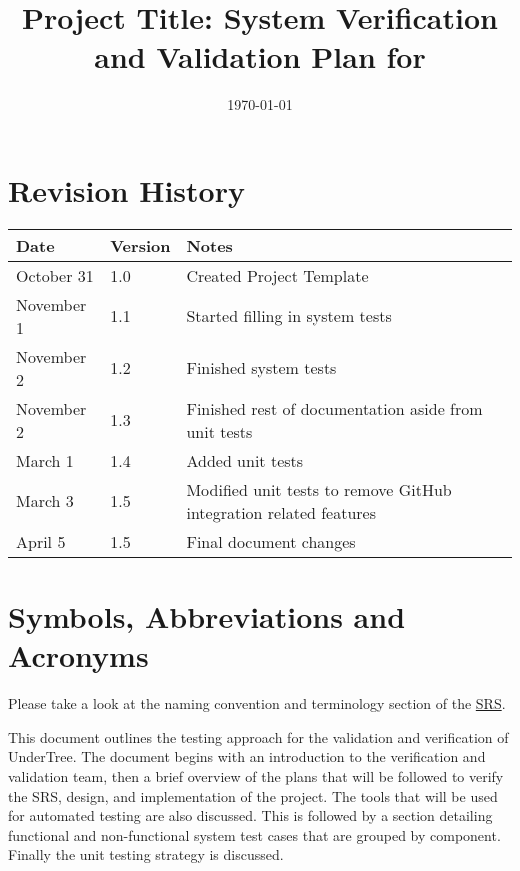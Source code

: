 \documentclass[12pt, titlepage]{article}
\begin{document}
	
	\title{Project Title: System Verification and Validation Plan for \progname{}} 
	\author{\authname}
	\date{\today}
	
	\maketitle
	
	
	\section{Revision History}
	
	\begin{tabularx}{\textwidth}{p{3cm}p{2cm}X}
		\toprule {\bf Date} & {\bf Version} & {\bf Notes}\\
		\midrule
		October 31 & 1.0 & Created Project Template\\
		November 1 & 1.1 & Started filling in system tests\\
		November 2 & 1.2 & Finished system tests\\
		November 2 & 1.3 & Finished rest of documentation aside from unit tests\\
		March 1 & 1.4 & Added unit tests\\
		March 3 & 1.5 & Modified unit tests to remove GitHub integration related features\\
		April 5 & 1.5 & Final document changes \\
		\bottomrule
	\end{tabularx}
	
	\newpage
	
	\tableofcontents
	
	\listoftables
	
	\newpage
	
	\section{Symbols, Abbreviations and Acronyms}
	
	Please take a look at the naming convention and terminology section of the \href{https://github.com/RutheniumVI/UnderTree/blob/main/docs/SRS/SRS.pdf}{SRS}.
	
	\newpage
	
	
	This document outlines the testing approach for the validation and verification of UnderTree. The document begins with an introduction to the verification and validation team, then a brief overview of the plans that will be followed to verify the SRS, design, and implementation of the project. The tools that will be used for automated testing are also discussed. This is followed by a section detailing functional and non-functional system test cases that are grouped by component. Finally the unit testing strategy is discussed. 
	
\end{document}
